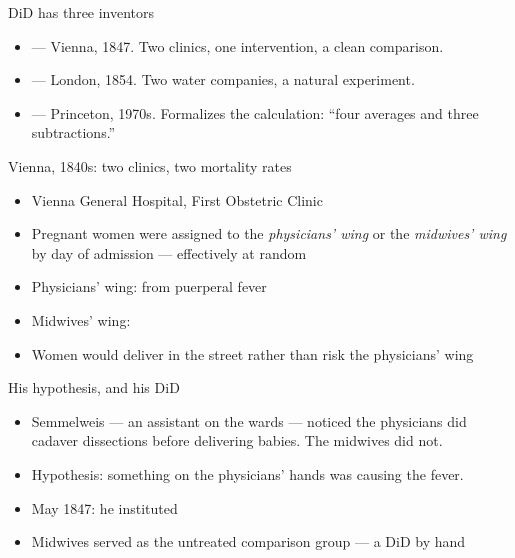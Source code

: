 \documentclass[aspectratio=169,11pt]{beamer}
\begin{document}
\begin{frame}{DiD has three inventors}
\vspace{0.4em}
\begin{itemize}
  \item {} --- Vienna, 1847. Two clinics, one intervention, a clean comparison.
  \item {} --- London, 1854. Two water companies, a natural experiment.
  \item {} --- Princeton, 1970s. Formalizes the calculation: ``four averages and three subtractions.''
\end{itemize}
\vspace{0.6em}
\end{frame}


\begin{frame}{Vienna, 1840s: two clinics, two mortality rates}
\vspace{0.4em}
\begin{itemize}
  \item Vienna General Hospital, First Obstetric Clinic
  \item Pregnant women were assigned to the \textit{physicians' wing} or the \textit{midwives' wing} by day of admission --- effectively at random
  \item Physicians' wing:  from puerperal fever
  \item Midwives' wing: 
  \item Women would deliver in the street rather than risk the physicians' wing
\end{itemize}
\end{frame}

\begin{frame}{His hypothesis, and his DiD}
\vspace{0.4em}
\begin{itemize}
  \item Semmelweis --- an assistant on the wards --- noticed the physicians did cadaver dissections before delivering babies. The midwives did not.
  \item Hypothesis: something on the physicians' hands was causing the fever.
  \item May 1847: he instituted 
  \item Midwives served as the untreated comparison group --- a DiD by hand
\end{itemize}
\end{frame}
\end{document}
